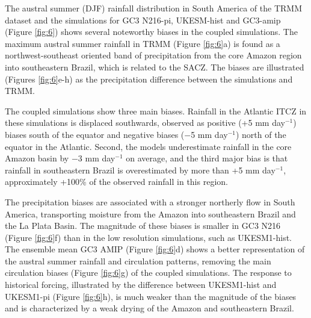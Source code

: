   The austral summer (DJF) rainfall distribution in South America of the TRMM dataset and the simulations for GC3 N216-pi, UKESM-hist and GC3-amip (Figure \ref{fig:6}) shows several noteworthy biases in the coupled simulations. 
The maximum austral summer rainfall in TRMM
(Figure \ref{fig:6}a) is found as a northwest-southeast oriented band of precipitation from the core Amazon region into southeastern Brazil, which is related to the SACZ.
The biases are illustrated (Figures \ref{fig:6}e-h) as the precipitation difference between the simulations and TRMM.
 
 

   The coupled simulations show three main biases.
Rainfall in the Atlantic ITCZ in these simulations is displaced southwards, observed as positive (+5 mm day$^{-1}$) biases south of the equator and negative biases ($-$5 mm day$^{-1}$) north of the equator in the Atlantic.
Second, the models underestimate rainfall in the core Amazon basin by $-$3 mm day$^{-1}$ on average, and the third major bias is that rainfall in southeastern Brazil is overestimated by more than +5 mm day$^{-1}$, approximately +100\% of the observed rainfall in this region.  

 The precipitation biases are associated with a stronger northerly flow in South America, transporting moisture from the Amazon into southeastern Brazil and the La Plata Basin.   
The magnitude of these biases is smaller in GC3 N216 (Figure \ref{fig:6}f) than in the low resolution simulations, such as UKESM1-hist.   The ensemble mean GC3 AMIP (Figure \ref{fig:6}d) shows a better representation of the austral summer rainfall and circulation patterns, removing the main circulation biases (Figure \ref{fig:6}g) of the coupled simulations.   
The response to historical forcing, illustrated by the difference between UKESM1-hist and UKESM1-pi (Figure \ref{fig:6}h), is much weaker than the magnitude of the biases and is characterized by a weak drying of the Amazon and southeastern Brazil.


